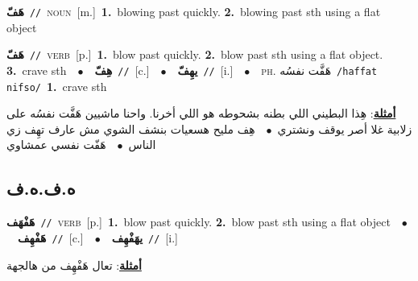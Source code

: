 \documentclass[10pt,a4paper,twoside]{article} %
\begin{document}
\begin{multicols}{2}
{\setlength\topsep{0pt}\textbf{\foreignlanguage{arabic}{هَفّ}}\ {\color{gray}\texttt{//}\color{black}}\ \textsc{noun}\ [m.]\ \textbf{1.}~blowing past quickly.  \textbf{2.}~blowing past sth using a flat object\ } \vspace{2mm}

{\setlength\topsep{0pt}\textbf{\foreignlanguage{arabic}{هَفّ}}\ {\color{gray}\texttt{//}\color{black}}\ \textsc{verb}\ [p.]\ \textbf{1.}~blow past quickly.  \textbf{2.}~blow past sth using a flat object.  \textbf{3.}~crave sth\ \ $\bullet$\ \ \setlength\topsep{0pt}\textbf{\foreignlanguage{arabic}{هِفّ}}\ {\color{gray}\texttt{//}\color{black}}\ [c.]\ \ $\bullet$\ \ \setlength\topsep{0pt}\textbf{\foreignlanguage{arabic}{يهِفّ}}\ {\color{gray}\texttt{//}\color{black}}\ [i.]\ \ $\bullet$\ \ \textsc{ph.} \color{gray} \foreignlanguage{arabic}{هَفَّت نفسُه}\color{black}\ {\color{gray}\texttt{/{\sffamily haffat nifso}/}\color{black}}\ \textbf{1.}~crave sth\  \begin{flushright}\color{gray}\foreignlanguage{arabic}{\textbf{\underline{\foreignlanguage{arabic}{أمثلة}}}: هِذا البطيني اللي بطنه بشحوطه هو اللي أخرنا. واحنا ماشيين هَفَّت نفسُه على زلابية غلا أصر يوقف ونشتري\ $\bullet$\ \  هِف مليح هسعيات بنشف الشوي مش عارف تهِف زي الناس\ $\bullet$\ \  هَفّت نفسي عمشاوي}\end{flushright}\color{black}} \vspace{2mm}

\vspace{-3mm}
\subsection*{\color{blue}\foreignlanguage{arabic}{ه.ف.ه.ف}\color{blue}{}} 

{\setlength\topsep{0pt}\textbf{\foreignlanguage{arabic}{هَفْهَف}}\ {\color{gray}\texttt{//}\color{black}}\ \textsc{verb}\ [p.]\ \textbf{1.}~blow past quickly.  \textbf{2.}~blow past sth using a flat object\ \ $\bullet$\ \ \setlength\topsep{0pt}\textbf{\foreignlanguage{arabic}{هَفْهِف}}\ {\color{gray}\texttt{//}\color{black}}\ [c.]\ \ $\bullet$\ \ \setlength\topsep{0pt}\textbf{\foreignlanguage{arabic}{يهَفْهِف}}\ {\color{gray}\texttt{//}\color{black}}\ [i.]\  \begin{flushright}\color{gray}\foreignlanguage{arabic}{\textbf{\underline{\foreignlanguage{arabic}{أمثلة}}}: تعال هَفْهِف من هالجهة}\end{flushright}\color{black}} \vspace{2mm}


\end{multicols}
\end{document}

